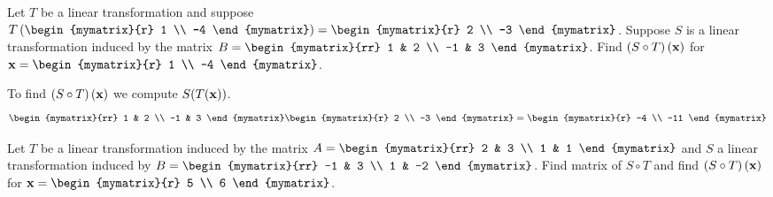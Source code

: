 \begin{enumialphparenastyle}
\begin{ex}
\begin{sol}
\end{sol}
\end{ex}


\begin{ex} Let $T$ be a linear transformation and suppose $T \left( \begin{mymatrix}{r}
1 \\
-4 
\end{mymatrix} \right) = \begin{mymatrix}{r}
2 \\
-3 
\end{mymatrix}$. Suppose $S$ is a linear transformation induced by the matrix $B = \begin{mymatrix}{rr}
1 & 2 \\
-1 & 3
\end{mymatrix}$. Find $\left( S \circ T \right) \left( {\bf x} \right)$ for $\vect{x} = \begin{mymatrix}{r}
1 \\
-4
\end{mymatrix}$. 
\begin{sol}
To find $\left( S \circ T \right) \left( {\bf x} \right)$ we compute $S(T({\bf x}))$. 
\[
\begin{mymatrix}{rr}
1 & 2 \\
-1 & 3
\end{mymatrix}
\begin{mymatrix}{r}
2 \\
-3 
\end{mymatrix}
 = \begin{mymatrix}{r}
-4 \\
-11
\end{mymatrix}
\]
\end{sol}
\end{ex}


\begin{ex}  Let $T$ be a linear transformation induced by the matrix $A = \begin{mymatrix}{rr}
2 & 3 \\
1 & 1
\end{mymatrix}$ and $S$ a linear transformation induced by $B = \begin{mymatrix}{rr}
-1 & 3 \\
1 & -2 
\end{mymatrix}$. Find matrix of $S \circ T$ and find $\left( S \circ T \right) \left( {\bf x} \right)$ for $\vect{x} = \begin{mymatrix}{r}
5 \\
6 
\end{mymatrix}$. 
\end{ex}



\end{enumialphparenastyle}
